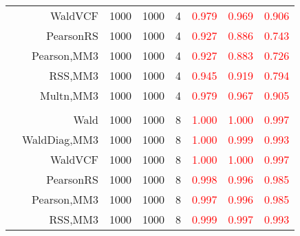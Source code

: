 \documentclass[
]{article}
\begin{document}
\begin{table}[H]
{\begin{tabular}[t]{lrrrrrrr}
\hspace{1em} & WaldVCF & 1000 & 1000 & 4 & \textcolor{red}{0.979} & \textcolor{red}{0.969} & \textcolor{red}{0.906}\\

\hspace{1em} & PearsonRS & 1000 & 1000 & 4 & \textcolor{red}{0.927} & \textcolor{red}{0.886} & \textcolor{red}{0.743}\\

\hspace{1em} & Pearson,MM3 & 1000 & 1000 & 4 & \textcolor{red}{0.927} & \textcolor{red}{0.883} & \textcolor{red}{0.726}\\

\hspace{1em} & RSS,MM3 & 1000 & 1000 & 4 & \textcolor{red}{0.945} & \textcolor{red}{0.919} & \textcolor{red}{0.794}\\

\hspace{1em} & Multn,MM3 & 1000 & 1000 & 4 & \textcolor{red}{0.979} & \textcolor{red}{0.967} & \textcolor{red}{0.905}\\
\cmidrule{1-8}
\addlinespace[0.3em]
\multicolumn{8}{l}{\textbf{1F 15V}}\\
\hspace{1em} & Wald & 1000 & 1000 & 8 & \textcolor{red}{1.000} & \textcolor{red}{1.000} & \textcolor{red}{0.997}\\

\hspace{1em} & WaldDiag,MM3 & 1000 & 1000 & 8 & \textcolor{red}{1.000} & \textcolor{red}{0.999} & \textcolor{red}{0.993}\\

\hspace{1em} & WaldVCF & 1000 & 1000 & 8 & \textcolor{red}{1.000} & \textcolor{red}{1.000} & \textcolor{red}{0.997}\\

\hspace{1em} & PearsonRS & 1000 & 1000 & 8 & \textcolor{red}{0.998} & \textcolor{red}{0.996} & \textcolor{red}{0.985}\\

\hspace{1em} & Pearson,MM3 & 1000 & 1000 & 8 & \textcolor{red}{0.997} & \textcolor{red}{0.996} & \textcolor{red}{0.985}\\

\hspace{1em} & RSS,MM3 & 1000 & 1000 & 8 & \textcolor{red}{0.999} & \textcolor{red}{0.997} & \textcolor{red}{0.993}\\


\end{tabular}}
\end{table}
\end{document}
